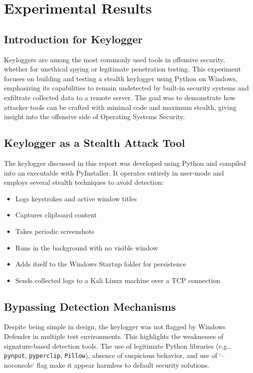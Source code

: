 \setcounter{secnumdepth}{-1}

\chapter{Experimental Results}

\section{Introduction for Keylogger}
Keyloggers are among the most commonly used tools in offensive security, whether for unethical spying or legitimate penetration testing. This experiment focuses on building and testing a stealth keylogger using Python on Windows, emphasizing its capabilities to remain undetected by built-in security systems and exfiltrate collected data to a remote server. The goal was to demonstrate how attacker tools can be crafted with minimal code and maximum stealth, giving insight into the offensive side of Operating Systems Security.

\section{Keylogger as a Stealth Attack Tool}
The keylogger discussed in this report was developed using Python and compiled into an executable with PyInstaller. It operates entirely in user-mode and employs several stealth techniques to avoid detection:
\begin{itemize}
    \item Logs keystrokes and active window titles
    \item Captures clipboard content
    \item Takes periodic screenshots
    \item Runs in the background with no visible window
    \item Adds itself to the Windows Startup folder for persistence
    \item Sends collected logs to a Kali Linux machine over a TCP connection
\end{itemize}

\section{Bypassing Detection Mechanisms}
Despite being simple in design, the keylogger was not flagged by Windows Defender in multiple test environments. This highlights the weaknesses of signature-based detection tools. The use of legitimate Python libraries (e.g., \texttt{pynput}, \texttt{pyperclip}, \texttt{Pillow}), absence of suspicious behavior, and use of `--noconsole` flag make it appear harmless to default security solutions.

